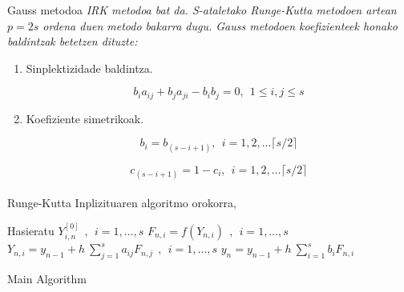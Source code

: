 Gauss metodoa \it IRK metodoa bat da. S-ataletako Runge-Kutta metodoen artean $p=2s$ ordena duen metodo bakarra dugu. Gauss metodoen koefizienteek honako baldintzak betetzen dituzte:

\begin{enumerate}
\item{Sinplektizidade baldintza}.

\begin{equation} \label{eq:1}
b_{i}a_{ij}+b_{j}a_{ji}-b_{i}b_{j}=0, \ \ 1 \leqslant i,j \leqslant s
\end{equation}
 
\item{Koefiziente simetrikoak}.

 \begin{equation} \label {eq:2}
 b_{i} = b_{(s-i+1)} ,\ \  i=1,2,\dots \lceil s/2\rceil
 \end{equation}
 
  \begin{equation} \label{eq:3}
 c_{(s-i+1)}= 1-c_{i}, \ \  i=1,2,\dots \lceil s/2\rceil
 \end{equation} 
  
\end{enumerate}

\paragraph*{}Runge-Kutta Inplizituaren algoritmo orokorra,

\begin{algorithm}[H]
 \BlankLine
  {
   \BlankLine
   Hasieratu  $Y_{i,n}^{[0]} \ \ , \ \ i=1,\dots,s $\;
    \BlankLine
   {
    \BlankLine 
    $F_{n,i}=f(Y_{n,i}) \ \ , \ \  i=1,\dots,s$\;
    $Y_{n,i}=y_{n-1}+ h \ \sum\limits_{j=1}^{s} a_{ij} F_{n,j}  \ \ , \ \  i=1,\dots,s$\;  
   }
   \BlankLine
    $y_{n}=y_{n-1}+ h \ \sum\limits_{i=1}^{s} b_i F_{n,i} $\;
   \BlankLine
 }
 \caption{Main Algorithm}
\end{algorithm}

